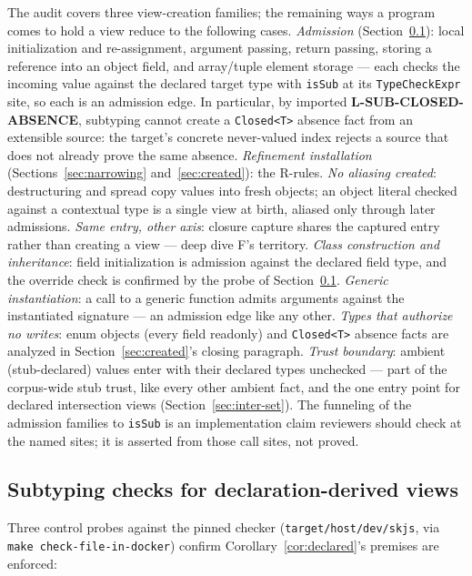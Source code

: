 \documentclass[11pt]{article}
\begin{document}
The audit covers three view-creation families; the remaining ways a
program comes to hold a view reduce to the following cases.
\emph{Admission} (Section~\ref{sec:declared}): local
initialization and re-assignment, argument passing, return passing,
storing a reference into an object field, and array/tuple element
storage — each checks the incoming value against the declared target
type with \texttt{isSub} at its \texttt{TypeCheckExpr} site, so each
is an admission edge. In particular, by imported
\textbf{L-SUB-CLOSED-ABSENCE}, subtyping cannot create a
\texttt{Closed<T>} absence fact from an extensible source: the target's
concrete never-valued index rejects a source that does not already prove
the same absence.
\emph{Refinement installation}
(Sections~\ref{sec:narrowing} and~\ref{sec:created}): the R-rules.
\emph{No aliasing created}:
destructuring and spread copy values into fresh objects; an object
literal checked against a contextual type is a single view at birth,
aliased only through later admissions. \emph{Same entry, other axis}:
closure capture shares the captured entry rather than creating a view —
deep dive F's territory. \emph{Class construction and inheritance}:
field initialization is admission against the declared field type, and
the override check is confirmed by the probe of
Section~\ref{sec:declared}. \emph{Generic instantiation}: a call to a
generic function admits arguments against the instantiated signature —
an admission edge like any other. \emph{Types that authorize no
writes}: enum objects (every field readonly) and \texttt{Closed<T>}
absence facts are analyzed in Section~\ref{sec:created}'s closing
paragraph. \emph{Trust
boundary}: ambient (stub-declared) values enter with their declared
types unchecked — part of the corpus-wide stub trust, like every other
ambient fact, and the one entry point for declared intersection views
(Section~\ref{sec:inter-set}). The funneling of the admission families
to \texttt{isSub} is an implementation claim reviewers should check at
the named sites; it is asserted from those call sites, not proved.

\subsection{Subtyping checks for declaration-derived views}
\label{sec:declared}

Three control probes against the pinned checker
(\texttt{target/host/dev/skjs}, via \texttt{make check-file-in-docker})
confirm
Corollary~\ref{cor:declared}'s premises are enforced:
\end{document}
